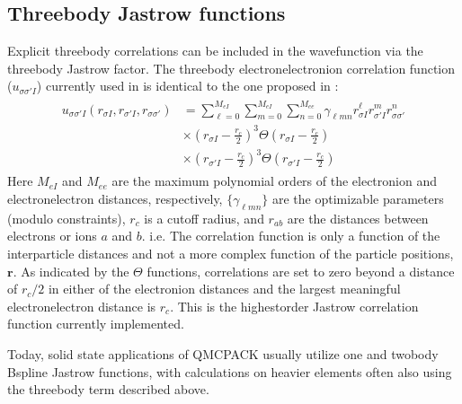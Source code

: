 \documentclass[letterpaper,10pt,english]{sphinxmanual}
\begin{document}
\subsection{Three\sphinxhyphen{}body Jastrow functions}
\label{\detokenize{intro_wavefunction:three-body-jastrow-functions}}
Explicit three\sphinxhyphen{}body correlations can be included in the wavefunction via
the three\sphinxhyphen{}body Jastrow factor. The three\sphinxhyphen{}body electron\sphinxhyphen{}electron\sphinxhyphen{}ion
correlation function (\(u_{\sigma\sigma'I}\)) currently used in is
identical to the one proposed in :
\begin{equation}\label{equation:intro_wavefunction:eq23}
\begin{split} \begin{aligned}
 u_{\sigma\sigma'I}(r_{\sigma I},r_{\sigma'I},r_{\sigma\sigma'}) &= \sum_{\ell=0}^{M_{eI}}\sum_{m=0}^{M_{eI}}\sum_{n=0}^{M_{ee}}\gamma_{\ell mn} r_{\sigma I}^\ell r_{\sigma'I}^m r_{\sigma\sigma'}^n \\
    &\times \left(r_{\sigma I}-\frac{r_c}{2}\right)^3 \Theta\left(r_{\sigma I}-\frac{r_c}{2}\right) \nonumber \\
    &\times \left(r_{\sigma' I}-\frac{r_c}{2}\right)^3 \Theta\left(r_{\sigma' I}-\frac{r_c}{2}\right) \nonumber\end{aligned}\end{split}
\end{equation}
Here \(M_{eI}\) and \(M_{ee}\) are the maximum polynomial orders
of the electron\sphinxhyphen{}ion and electron\sphinxhyphen{}electron distances, respectively,
\(\{\gamma_{\ell mn}\}\) are the optimizable parameters (modulo
constraints), \(r_c\) is a cutoff radius, and \(r_{ab}\) are the
distances between electrons or ions \(a\) and \(b\). i.e. The
correlation function is only a function of the interparticle distances
and not a more complex function of the particle positions,
\(\mathbf{r}\). As indicated by the \(\Theta\) functions,
correlations are set to zero beyond a distance of \(r_c/2\) in
either of the electron\sphinxhyphen{}ion distances and the largest meaningful
electron\sphinxhyphen{}electron distance is \(r_c\). This is the highest\sphinxhyphen{}order
Jastrow correlation function currently implemented.

Today, solid state applications of QMCPACK usually utilize one and
two\sphinxhyphen{}body B\sphinxhyphen{}spline Jastrow functions, with calculations on heavier
elements often also using the three\sphinxhyphen{}body term described above.
\end{document}
